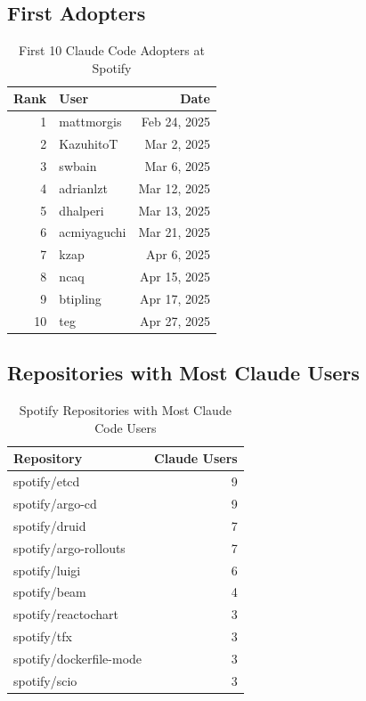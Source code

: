 \documentclass[11pt]{article}
\begin{document}
\subsection{First Adopters}

\begin{table}[H]
\centering
\caption{First 10 Claude Code Adopters at Spotify}
\label{tab:first_adopters}
\begin{tabular}{rlr}
\toprule
\textbf{Rank} & \textbf{User} & \textbf{Date} \\
\midrule
1 & mattmorgis & Feb 24, 2025 \\
2 & KazuhitoT & Mar 2, 2025 \\
3 & swbain & Mar 6, 2025 \\
4 & adrianlzt & Mar 12, 2025 \\
5 & dhalperi & Mar 13, 2025 \\
6 & acmiyaguchi & Mar 21, 2025 \\
7 & kzap & Apr 6, 2025 \\
8 & ncaq & Apr 15, 2025 \\
9 & btipling & Apr 17, 2025 \\
10 & teg & Apr 27, 2025 \\
\bottomrule
\end{tabular}
\end{table}

\subsection{Repositories with Most Claude Users}

\begin{table}[H]
\centering
\caption{Spotify Repositories with Most Claude Code Users}
\label{tab:repos}
\begin{tabular}{lr}
\toprule
\textbf{Repository} & \textbf{Claude Users} \\
\midrule
spotify/etcd & 9 \\
spotify/argo-cd & 9 \\
spotify/druid & 7 \\
spotify/argo-rollouts & 7 \\
spotify/luigi & 6 \\
spotify/beam & 4 \\
spotify/reactochart & 3 \\
spotify/tfx & 3 \\
spotify/dockerfile-mode & 3 \\
spotify/scio & 3 \\
\bottomrule
\end{tabular}
\end{table}
\end{document}
